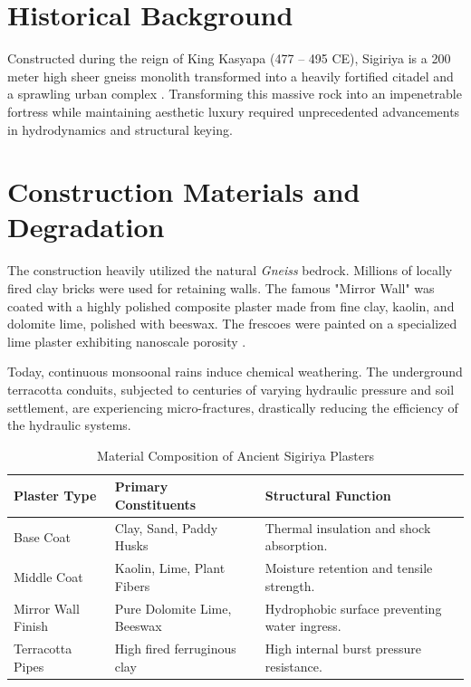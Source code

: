 \documentclass[12pt,a4paper]{report}
\begin{document}
	\section{Historical Background}
	Constructed during the reign of King Kasyapa (477 – 495 CE), Sigiriya is a 200 meter high sheer gneiss monolith transformed into a heavily fortified citadel and a sprawling urban complex \cite{bandaranayake1974}. Transforming this massive rock into an impenetrable fortress while maintaining aesthetic luxury required unprecedented advancements in hydrodynamics and structural keying.
	
	\section{Construction Materials and Degradation}
	The construction heavily utilized the natural \textit{Gneiss} bedrock. Millions of locally fired clay bricks were used for retaining walls. The famous "Mirror Wall" was coated with a highly polished composite plaster made from fine clay, kaolin, and dolomite lime, polished with beeswax. The frescoes were painted on a specialized lime plaster exhibiting nanoscale porosity \cite{silva2020}.
	
	Today, continuous monsoonal rains induce chemical weathering. The underground terracotta conduits, subjected to centuries of varying hydraulic pressure and soil settlement, are experiencing micro-fractures, drastically reducing the efficiency of the hydraulic systems.
	
	\begin{table}[H]
		\centering
		\caption{Material Composition of Ancient Sigiriya Plasters}
		\label{tab:sigiriya_materials}
		\begin{tabular}{@{}llp{6cm}@{}}
			\toprule
			\textbf{Plaster Type} & \textbf{Primary Constituents} & \textbf{Structural Function} \\ \midrule
			Base Coat & Clay, Sand, Paddy Husks & Thermal insulation and shock absorption. \\
			Middle Coat & Kaolin, Lime, Plant Fibers & Moisture retention and tensile strength. \\
			Mirror Wall Finish & Pure Dolomite Lime, Beeswax & Hydrophobic surface preventing water ingress. \\
			Terracotta Pipes & High fired ferruginous clay & High internal burst pressure resistance. \\ \bottomrule
		\end{tabular}
	\end{table}
	
\end{document}
